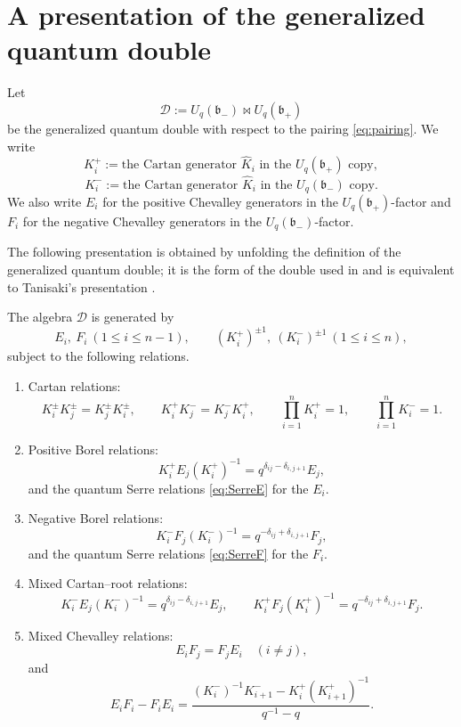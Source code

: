 \documentclass[11pt]{article}
\newcommand{\fb}{\mathfrak b}
\newcommand{\Uq}{U_q}
\newcommand{\bipr}{\bowtie}
\begin{document}
\section{A presentation of the generalized quantum double}

Let
\[
\mathcal D:=\Uq(\fb_-)\bipr \Uq(\fb_+)
\]
be the generalized quantum double with respect to the pairing \eqref{eq:pairing}.  We write
\[
K_i^+:=\text{the Cartan generator }\widehat K_i\text{ in the }\Uq(\fb_+)\text{ copy},
\]
\[
K_i^-:=\text{the Cartan generator }\widehat K_i\text{ in the }\Uq(\fb_-)\text{ copy}.
\]
We also write \(E_i\) for the positive Chevalley generators in the \(\Uq(\fb_+)\)-factor and \(F_i\) for the negative Chevalley generators in the \(\Uq(\fb_-)\)-factor.

The following presentation is obtained by unfolding the definition of the generalized quantum double; it is the form of the double used in \cite{KS} and is equivalent to Tanisaki's presentation \cite{Tanisaki}.

\begin{lemma}\label{lem:double}
The algebra \(\mathcal D\) is generated by
\[
E_i,\ F_i\ (1\le i\le n-1),\qquad (K_i^+)^{\pm1},\ (K_i^-)^{\pm1}\ (1\le i\le n),
\]
subject to the following relations.
\begin{enumerate}[label=(D\arabic*)]
\item Cartan relations:
\[
K_i^\pm K_j^\pm=K_j^\pm K_i^\pm,\qquad
K_i^+K_j^-=K_j^-K_i^+,\qquad
\prod_{i=1}^n K_i^+=1,\qquad \prod_{i=1}^n K_i^-=1.
\]
\item Positive Borel relations:
\[
K_i^+E_j(K_i^+)^{-1}=q^{\delta_{ij}-\delta_{i,j+1}}E_j,
\]
and the quantum Serre relations \eqref{eq:SerreE} for the \(E_i\).
\item Negative Borel relations:
\[
K_i^-F_j(K_i^-)^{-1}=q^{-\delta_{ij}+\delta_{i,j+1}}F_j,
\]
and the quantum Serre relations \eqref{eq:SerreF} for the \(F_i\).
\item Mixed Cartan--root relations:
\[
K_i^-E_j(K_i^-)^{-1}=q^{\delta_{ij}-\delta_{i,j+1}}E_j,
\qquad
K_i^+F_j(K_i^+)^{-1}=q^{-\delta_{ij}+\delta_{i,j+1}}F_j.
\]
\item Mixed Chevalley relations:
\[
E_iF_j=F_jE_i\quad(i\neq j),
\]
and
\begin{equation}\label{eq:EFdouble}
E_iF_i-F_iE_i
=
\frac{(K_i^-)^{-1}K_{i+1}^- - K_i^+(K_{i+1}^+)^{-1}}
{q^{-1}-q}.
\end{equation}
\end{enumerate}
\end{lemma}
\end{document}
